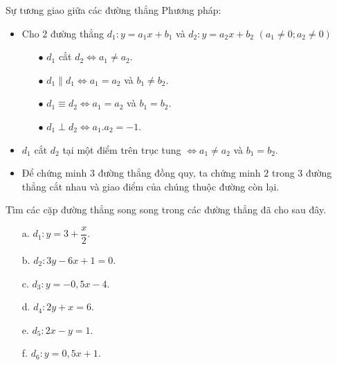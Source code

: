 \begin{dang}{Sự tương giao giữa các đường thẳng}
	Phương pháp:
	\begin{itemize}
		\item Cho $2$ đường thẳng $d_1:y=a_1x+b_1$ và $d_2:y=a_2x+b_2$ $(a_1 \neq 0; a_2 \neq 0)$
		\begin{itemize}
			\item[$\bullet$] $d_1$ cắt $d_2 \Leftrightarrow a_1 \neq a_2$.
			\item[$\bullet$] $d_1 \parallel d_1 \Leftrightarrow a_1 = a_2$ và $b_1 \neq b_2$.\\
			\item[$\bullet$] $d_1 \equiv d_2 \Leftrightarrow a_1 = a_2$ và $b_1 = b_2$.\\
			\item[$\bullet$] $d_1 \perp d_2 \Leftrightarrow a_1.a_2=-1$.
		\end{itemize}
		\item $d_1$ cắt $d_2$ tại một điểm trên trục tung $\Leftrightarrow a_1 \neq a_2$ và $b_1 = b_2$.
		\item Để chứng minh $3$ đường thẳng đồng quy, ta chứng minh $2$ trong $3$ đường thẳng cắt nhau và giao điểm của chúng thuộc đường còn lại.
	\end{itemize}
\end{dang}
\begin{vd}%
	Tìm các cặp đường thẳng song song trong các đường thẳng đã cho sau đây.
	\begin{multicols}{2}
		\begin{itemize}
			\item [a.] $d_1: y=3+\dfrac{x}{2}$.
			\item [b.] $d_2: 3y-6x+1=0$.
			\item [c.] $d_3: y=-0,5x-4$.
			\item [d.] $d_4: 2y+x=6$.
			\item [e.] $d_5: 2x-y=1$.
			\item [f.] $d_6: y=0,5x+1$.
		\end{itemize}
	\end{multicols}
\end{vd}
